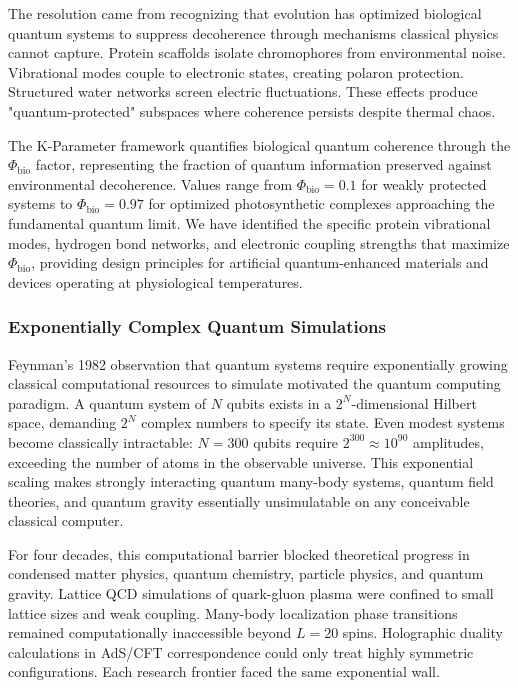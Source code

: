 \documentclass[11pt,a4paper,twoside]{article}
\begin{document}
The resolution came from recognizing that evolution has optimized biological quantum systems to suppress decoherence through mechanisms classical physics cannot capture. Protein scaffolds isolate chromophores from environmental noise. Vibrational modes couple to electronic states, creating polaron protection. Structured water networks screen electric fluctuations. These effects produce "quantum-protected" subspaces where coherence persists despite thermal chaos.

The K-Parameter framework quantifies biological quantum coherence through the $\Phi_{\text{bio}}$ factor, representing the fraction of quantum information preserved against environmental decoherence. Values range from $\Phi_{\text{bio}} = 0.1$ for weakly protected systems to $\Phi_{\text{bio}} = 0.97$ for optimized photosynthetic complexes approaching the fundamental quantum limit. We have identified the specific protein vibrational modes, hydrogen bond networks, and electronic coupling strengths that maximize $\Phi_{\text{bio}}$, providing design principles for artificial quantum-enhanced materials and devices operating at physiological temperatures.

\subsubsection*{Exponentially Complex Quantum Simulations}

Feynman's 1982 observation that quantum systems require exponentially growing classical computational resources to simulate motivated the quantum computing paradigm. A quantum system of $N$ qubits exists in a $2^N$-dimensional Hilbert space, demanding $2^N$ complex numbers to specify its state. Even modest systems become classically intractable: $N = 300$ qubits require $2^{300} \approx 10^{90}$ amplitudes, exceeding the number of atoms in the observable universe. This exponential scaling makes strongly interacting quantum many-body systems, quantum field theories, and quantum gravity essentially unsimulatable on any conceivable classical computer.

For four decades, this computational barrier blocked theoretical progress in condensed matter physics, quantum chemistry, particle physics, and quantum gravity. Lattice QCD simulations of quark-gluon plasma were confined to small lattice sizes and weak coupling. Many-body localization phase transitions remained computationally inaccessible beyond $L = 20$ spins. Holographic duality calculations in AdS/CFT correspondence could only treat highly symmetric configurations. Each research frontier faced the same exponential wall.
\end{document}
